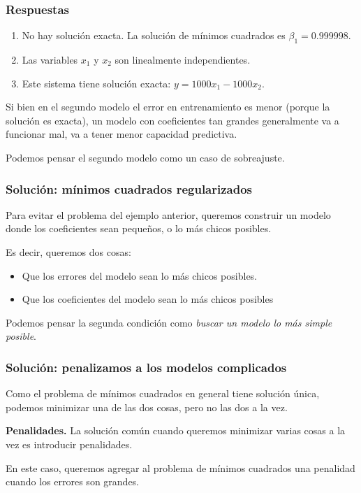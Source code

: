 \documentclass[aspectratio=169,12pt]{beamer}
\begin{document}
\begin{frame}
\frametitle{Respuestas}

\begin{enumerate}
\item No hay solución exacta. La solución de mínimos cuadrados es $\beta_1 = 0.999998$.
\item Las variables $x_1$ y $x_2$ son linealmente independientes.
\item Este sistema tiene solución exacta: $y = 1000 x_1 - 1000 x_2$.
\end{enumerate}

Si bien en el segundo modelo el error en entrenamiento es menor (porque la solución es exacta), un modelo con coeficientes tan grandes generalmente va a funcionar mal, va a tener menor capacidad predictiva.

Podemos pensar el segundo modelo como un caso de sobreajuste. 
\end{frame}


\begin{frame}
\frametitle{Solución: mínimos cuadrados regularizados}

Para evitar el problema del ejemplo anterior, queremos construir un modelo donde los coeficientes sean pequeños, o lo más chicos posibles.

Es decir, queremos dos cosas:
\begin{itemize}
\item Que los errores del modelo sean lo más chicos posibles.
\item Que los coeficientes del modelo sean lo más chicos posibles
\end{itemize}

Podemos pensar la segunda condición como \emph{buscar un modelo lo más simple posible}.

\end{frame}



\begin{frame}
\frametitle{Solución: penalizamos a los modelos complicados}

Como el problema de mínimos cuadrados en general tiene solución única, podemos minimizar una de las dos cosas, pero no las dos a la vez. 

\textbf{Penalidades.} La solución común cuando queremos minimizar varias cosas a la vez es introducir penalidades. 
 
En este caso, queremos agregar al problema de mínimos cuadrados una penalidad cuando los errores son grandes.

\end{frame}
\end{document}

